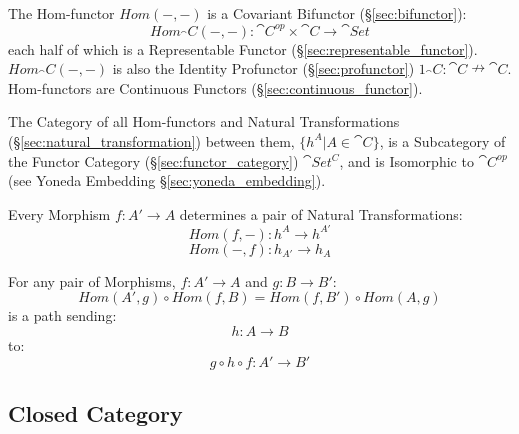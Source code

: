 The Hom-functor $Hom(-,-)$ is a Covariant Bifunctor
(\S\ref{sec:bifunctor}):
\[
  Hom_\cat{C}(-,-):
    \cat{C}^{op} \times \cat{C} \rightarrow \cat{Set}
\]
each half of which is a Representable Functor
(\S\ref{sec:representable_functor}). $Hom_\cat{C}(-,-)$ is also the
Identity Profunctor (\S\ref{sec:profunctor}) $1_\cat{C} :
\cat{C} \nrightarrow \cat{C}$. Hom-functors are Continuous
Functors (\S\ref{sec:continuous_functor}).

The Category of all Hom-functors and Natural Transformations
(\S\ref{sec:natural_transformation}) between them, $\{ h^A | A \in
\cat{C} \}$, is a Subcategory of the Functor Category
(\S\ref{sec:functor_category}) $\cat{Set^C}$, and is Isomorphic to
$\cat{C^{op}}$ (see Yoneda Embedding \S\ref{sec:yoneda_embedding}).

Every Morphism $f : A' \rightarrow A$ determines a pair of Natural
Transformations:
\[
  Hom(f,-) : h^A \rightarrow h^{A'}
\]\[
  Hom(-,f) : h_{A'} \rightarrow h_A
\]

For any pair of Morphisms, $f : A' \rightarrow A$ and $g : B
\rightarrow B'$:
\[
  Hom(A',g) \circ Hom(f,B) = Hom(f,B') \circ Hom(A,g)
\]
is a path sending:
\[
  h : A \rightarrow B
\]
to:
\[
  g \circ h \circ f : A' \rightarrow B'
\]



\subsection{Closed Category}\label{sec:closed_category}

